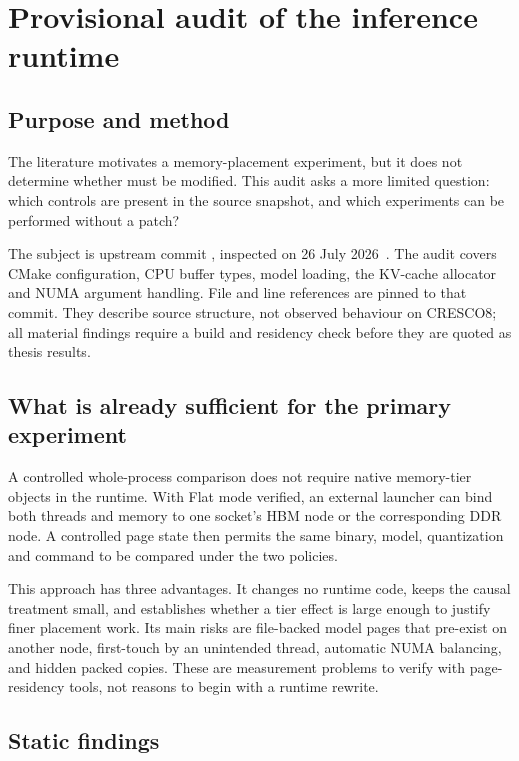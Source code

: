 \section{Provisional audit of the inference runtime}
\label{sec:audit}

\subsection{Purpose and method}

The literature motivates a memory-placement experiment, but it does
not determine whether \lcpp{} must be modified.  This audit asks a more
limited question: which controls are present in the source snapshot,
and which experiments can be performed without a patch?

The subject is upstream \lcpp{} commit
, inspected on
26 July 2026~\cite{llamacpp2026}.  The audit covers CMake
configuration, CPU buffer types, model loading, the KV-cache allocator
and NUMA argument handling.  File and line references are pinned to that
commit.  They describe source structure, not observed behaviour on
CRESCO8; all material findings require a build and residency check
before they are quoted as thesis results.

\subsection{What is already sufficient for the primary experiment}

A controlled whole-process comparison does not require native
memory-tier objects in the runtime.  With Flat mode verified, an external
launcher can bind both threads and memory to one socket's HBM node or
the corresponding DDR node.  A controlled page state then permits the
same binary, model, quantization and command to be compared under the
two policies.

This approach has three advantages.  It changes no runtime code, keeps
the causal treatment small, and establishes whether a tier effect is
large enough to justify finer placement work.  Its main risks are
file-backed model pages that pre-exist on another node, first-touch by
an unintended thread, automatic NUMA balancing, and hidden packed
copies.  These are measurement problems to verify with page-residency
tools, not reasons to begin with a runtime rewrite.

\subsection{Static findings}

